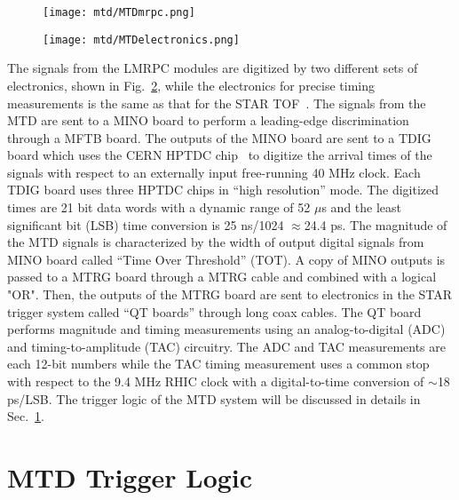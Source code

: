\begin{figure}[htbp]
\centering
\texttt{[image: mtd/MTDmrpc.png]}
 \label{mtdmrpc}
\end{figure}

\begin{figure}[htbp]
\centering
\texttt{[image: mtd/MTDelectronics.png]}
 \label{mtdelectronics}
\end{figure}

The signals from the LMRPC modules are digitized by two different sets of electronics, shown in Fig.~\ref{mtdelectronics}, while the electronics for precise timing measurements is the same as that for the STAR TOF~\cite{TOFelectronics}. The signals from the MTD are sent to a MINO board to perform a leading-edge discrimination through a MFTB board. The outputs of the MINO board are sent to a TDIG board which uses the CERN HPTDC chip~\cite{HPTDC} to digitize the arrival times of the signals with respect to an externally input free-running 40 MHz clock. Each TDIG board uses three HPTDC chips in ``high resolution'' mode. The digitized times are 21 bit data words with a dynamic range of 52 $\mu$s and the least significant bit (LSB) time conversion is 25 ns/1024 $\approx$24.4 ps. The magnitude of the MTD signals is characterized by the width of output digital signals from MINO board called ``Time Over Threshold'' (TOT). A copy of  MINO outputs is passed to a MTRG board through a MTRG cable and combined with a logical "OR". Then, the outputs of the MTRG board are sent to electronics in the STAR trigger system called ``QT boards'' through long coax cables. The QT board performs magnitude and timing measurements using an analog-to-digital (ADC) and timing-to-amplitude (TAC) circuitry. The ADC and TAC measurements are each 12-bit numbers while the TAC timing measurement uses a common stop with respect to the 9.4 MHz RHIC clock with a digital-to-time conversion of $\sim$18 ps/LSB. The trigger logic of the MTD system will be discussed in details in Sec.~\ref{mtdtriggersection}. 

\section{MTD Trigger Logic}
\label{mtdtriggersection}

